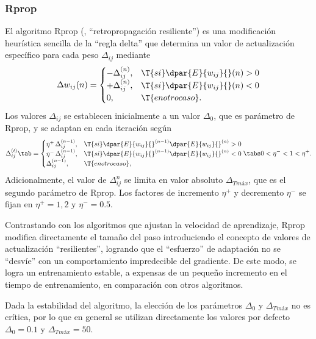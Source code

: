 %
\subsubsection{Rprop}
%
El algoritmo Rprop (,
``retropropagación resiliente'') \cite{rprop} es una modificación
heurística sencilla de la ``regla delta'' que determina un valor de
actualización específico para cada peso $\Delta_{ij}$ mediante
%
\begin{align}
  \Delta{}w_{ij}(n) = 
  \begin{cases}
    -\Delta_{ij}^{(n)}, & \T{si } \dpar{E}{w_{ij}}{}(n) > 0 \\
    +\Delta_{ij}^{(n)}, & \T{si } \dpar{E}{w_{ij}}{}(n) < 0 \\
    0, & \T{en otro caso}.
  \end{cases}
\end{align}
%
Los valores $\Delta_{ij}$ se establecen inicialmente a un valor
$\Delta_0$, que es parámetro de Rprop, y se adaptan en
cada iteración según
%
\begin{align}
  \Delta{}_{ij}^{(t)} \tab = 
  \begin{cases}
    \eta^+\,\Delta_{ij}^{(n-1)}, & \T{si }\dpar{E}{w_{ij}}{}^{(n-1)}
      \dpar{E}{w_{ij}}{}^{(n)} > 0 \\
    \eta^-\,\Delta_{ij}^{(n-1)}, & \T{si }\dpar{E}{w_{ij}}{}^{(n-1)}
      \dpar{E}{w_{ij}}{}^{(n)} < 0 \\
    \Delta_{ij}^{(n-1)}, & \T{en otro caso},
  \end{cases}
  \tabs 0<\eta^-<1<\eta^+.
\end{align}
%
Adicionalmente, el valor de $\Delta_{ij}^{n}$ se limita en valor
absoluto $\Delta_{T{máx}}$, que es el segundo parámetro de Rprop.  Los
factores de incremento $\eta^+$ y decremento $\eta^-$ se fijan en
$\eta^+=1,2$ y $\eta^-=0.5$.

Contrastando con los algoritmos que ajustan la velocidad de
aprendizaje, Rprop modifica directamente el tamaño del paso
introduciendo el concepto de valores de actualización ``resilientes'',
logrando que el ``esfuerzo'' de adaptación no se ``desvíe'' con un
comportamiento impredecible del gradiente. De este modo, se logra un
entrenamiento estable, a expensas de un pequeño incremento en el
tiempo de entrenamiento, en comparación con otros algoritmos.

Dada la estabilidad del algoritmo, la elección de los parámetros
$\Delta_{0}$ y $\Delta_{T{máx}}$ no es crítica, por lo que en general
se utilizan directamente los valores por defecto $\Delta_{0}=0.1$ y
$\Delta_{T{máx}}=50$.
